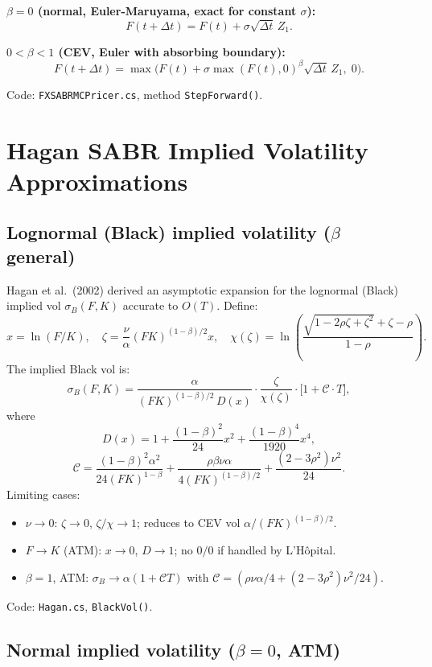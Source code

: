 \documentclass[11pt,a4paper]{article}
\newcommand{\coderef}[1]{\texttt{\color{blue!60!black}#1}}
\theoremstyle{definition}
\begin{document}
\textbf{$\beta=0$ (normal, Euler-Maruyama, exact for constant $\sigma$):}
\[
  F(t+\Delta t) = F(t) + \sigma\sqrt{\Delta t}\,Z_1.
\]

\textbf{$0<\beta<1$ (CEV, Euler with absorbing boundary):}
\[
  F(t+\Delta t) = \max\!\bigl(F(t)+\sigma\max(F(t),0)^\beta\sqrt{\Delta t}\,Z_1,\;0\bigr).
\]

Code: \coderef{FXSABRMCPricer.cs}, method \texttt{StepForward()}.

\section{Hagan SABR Implied Volatility Approximations}
\label{sec:hagan}

\subsection{Lognormal (Black) implied volatility ($\beta$ general)}

Hagan et al.\ (2002) derived an asymptotic expansion for the lognormal (Black)
implied vol $\sigma_B(F,K)$ accurate to $O(T)$.  Define:
\[
  x = \ln(F/K),\quad
  \zeta = \frac{\nu}{\alpha}(FK)^{(1-\beta)/2}x,\quad
  \chi(\zeta) = \ln\!\left(\frac{\sqrt{1-2\rho\zeta+\zeta^2}+\zeta-\rho}{1-\rho}\right).
\]
The implied Black vol is:
\[
  \sigma_B(F,K) = \frac{\alpha}{(FK)^{(1-\beta)/2}\,D(x)}
  \cdot\frac{\zeta}{\chi(\zeta)}\cdot\bigl[1+\mathcal{C}\cdot T\bigr],
\]
where
\[
  D(x) = 1+\frac{(1-\beta)^2}{24}x^2+\frac{(1-\beta)^4}{1920}x^4,
\]
\[
  \mathcal{C} = \frac{(1-\beta)^2\alpha^2}{24(FK)^{1-\beta}}
              + \frac{\rho\beta\nu\alpha}{4(FK)^{(1-\beta)/2}}
              + \frac{(2-3\rho^2)\nu^2}{24}.
\]
Limiting cases:
\begin{itemize}[nosep]
  \item $\nu\to 0$: $\zeta\to 0$, $\zeta/\chi\to 1$; reduces to CEV vol $\alpha/(FK)^{(1-\beta)/2}$.
  \item $F\to K$ (ATM): $x\to 0$, $D\to 1$; no $0/0$ if handled by L'H\^{o}pital.
  \item $\beta=1$, ATM: $\sigma_B\to\alpha(1+\mathcal{C}T)$ with $\mathcal{C}=(\rho\nu\alpha/4+(2-3\rho^2)\nu^2/24)$.
\end{itemize}

Code: \coderef{Hagan.cs}, \texttt{BlackVol()}.

\subsection{Normal implied volatility ($\beta=0$, ATM)}
\end{document}
